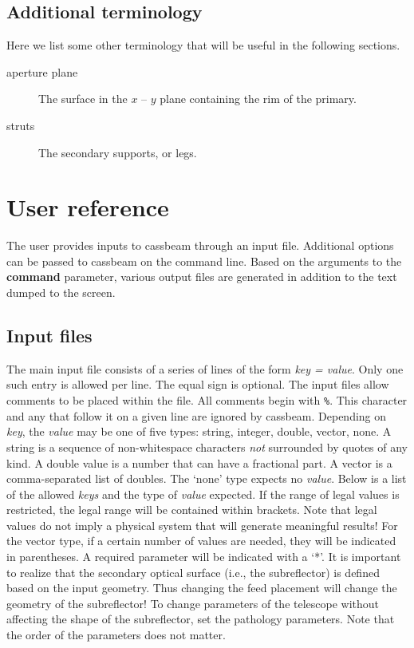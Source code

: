 \documentclass{article}
\begin{document}
\subsection{Additional terminology}

Here we list some other terminology that will be useful in the following 
sections.  
\begin{description}
\item[aperture plane] The surface in the $x$ -- $y$ plane containing the
rim of the primary.
\item[struts] The secondary supports, or legs.
\end{description}

\section{User reference}

The user provides inputs to cassbeam through an input file.  Additional
options can be passed to cassbeam on the command line.  Based on the arguments
to the {\bf command} parameter, various output files are generated in addition
to the text dumped to the screen.

\subsection{Input files} \label{sec:input}

The main input file consists of a series of lines of the form 
{\it key = value}.  Only one such entry is allowed per line.  The equal 
sign is optional.  The input
files allow comments to be placed within the file.  
All comments begin with {\tt \%}.  This character and any that follow it on
a given line are ignored by cassbeam.  Depending on {\it key}, the {\it value}
may be one of five types: string, integer, double, vector, none.
A string is a sequence of non-whitespace characters {\it not} surrounded 
by quotes of any kind.  A double value is a number that can have a fractional
part.  A vector is a comma-separated list of doubles.  The `none' type expects
no {\it value}.  Below is a list of
the allowed {\it keys} and the type of {\it value} expected.  If the range of
legal values is restricted, the legal range will be contained within brackets.
Note that legal values do not imply a physical system that will generate
meaningful results!  For the vector type, if a certain number of values are
needed, they will be indicated in parentheses.  A required parameter will 
be indicated with a `*'.  It is important to realize that
the secondary optical surface (i.e., the subreflector) is defined based on the
input geometry.  Thus changing the feed placement will change the geometry
of the subreflector!  To change parameters of the telescope without affecting
the shape of the subreflector, set the pathology parameters.  Note that the
order of the parameters does not matter.
\end{document}
